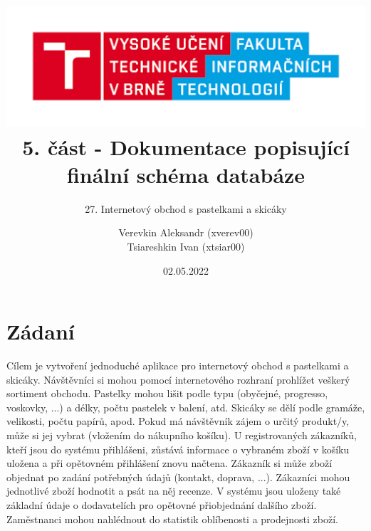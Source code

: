 \documentclass[12pt]{article}
\title{
\includegraphics[scale=0.7]{logo (1).png}\\
\huge{5. část - Dokumentace popisující finální schéma databáze}
}
\subtitle{27. Internetový obchod s pastelkami a skicáky}
\author{Verevkin Aleksandr (xverev00)\\
        Tsiareshkin Ivan (xtsiar00)}
\date{02.05.2022}
\begin{document}
\pagecolor{white}
\maketitle
\thispagestyle{empty}
\newpage

\section*{Zádaní}
    \indent Cílem je vytvoření jednoduché aplikace pro internetový obchod s pastelkami
    a skicáky. Návštěvníci si mohou pomocí internetového rozhraní prohlížet veškerý 
    sortiment obchodu. Pastelky mohou lišit podle typu (obyčejné, progresso,
    voskovky, ...) a délky, počtu pastelek v balení, atd. Skicáky se dělí podle gramáže, velikosti, počtu papírů, apod. Pokud má návštěvník zájem o určitý produkt/y, 
    může si jej vybrat (vložením do nákupního košíku). U registrovaných zákazníků, kteří jsou do systému přihlášeni, zůstává informace o vybraném zboží v košíku uložena a 
    při opětovném přihlášení znovu načtena. Zákazník si může zboží objednat po zadání potřebných údajů (kontakt, doprava, ...). Zákazníci mohou jednotlivé zboží hodnotit 
    a psát na něj recenze. V systému jsou uloženy také základní údaje o dodavatelích pro opětovné přiobjednání dalšího zboží. Zaměstnanci mohou nahlédnout do statistik oblíbenosti a prodejnosti zboží.
    
\end{document}
